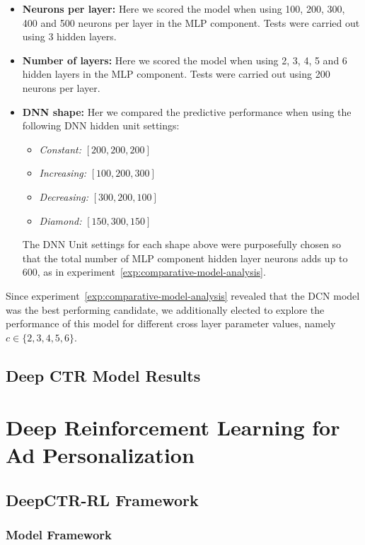 \documentclass{mldsmsc}
\begin{document}
\begin{itemize}
    \item \textbf{Neurons per layer:} Here we scored the model when using 100, 200, 300, 400
    and 500 neurons per layer in the MLP component. Tests were carried out using 3 hidden layers.
    \item \textbf{Number of layers:} Here we scored the model when using 2, 3, 4, 5 and 6 hidden layers in
    the MLP component. Tests were carried out using 200 neurons per layer.
    \item \textbf{DNN shape:} Her we compared the predictive performance when using the following
    DNN hidden unit settings:
    \begin{itemize}
        \item \emph{Constant:} $[200,200,200]$
        \item \emph{Increasing:} $[100,200,300]$
        \item \emph{Decreasing:} $[300,200,100]$
        \item \emph{Diamond:} $[150, 300, 150]$
    \end{itemize}

    The DNN Unit settings for each shape above were purposefully chosen so that the total number
    of MLP component hidden layer neurons adds up to 600, as in experiment~\ref{exp:comparative-model-analysis}.
\end{itemize}

Since experiment~\ref{exp:comparative-model-analysis} revealed that the DCN model was the best performing
candidate, we additionally elected to explore the performance of this model for different cross layer parameter
values, namely $c \in \{2,3,4,5,6\}$.

\section{Deep CTR Model Results}
\label{sec:model-results}

\chapter{Deep Reinforcement Learning for Ad Personalization}
\label{chap:deep-rl-for-ad-personalization}

\section{DeepCTR-RL Framework}

\subsection{Model Framework}
\end{document}
